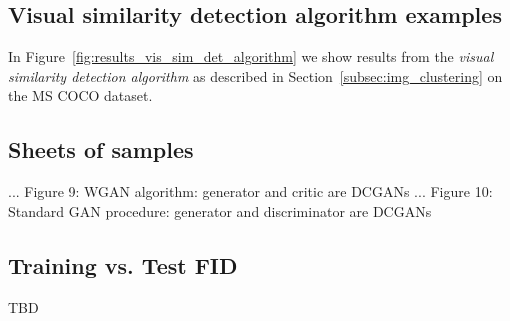 \documentclass[12pt,a4paper]{article}
\begin{document}
\begin{appendices}
\subsection{Visual similarity detection algorithm examples}\label{app:vsda_examples}
In Figure~\ref{fig:results_vis_sim_det_algorithm} we show results from the \textit{visual similarity detection algorithm} as described in Section~\ref{subsec:img_clustering} on the MS COCO dataset.


\subsection{Sheets of samples}\label{app:samples}
...
Figure 9: WGAN algorithm: generator and critic are DCGANs
...
Figure 10: Standard GAN procedure: generator and discriminator are DCGANs

\subsection{Training vs. Test FID}\label{app:train_vs_test_FID}
TBD
\end{appendices}
\end{document}
